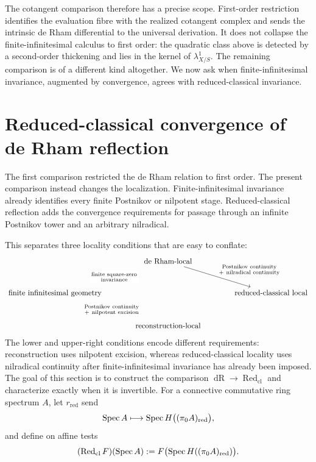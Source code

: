 The cotangent comparison therefore has a precise scope. First-order
restriction identifies the evaluation fibre with the realized cotangent
complex and sends the intrinsic de Rham differential to the universal
derivation. It does not collapse the finite-infinitesimal calculus to first
order: the quadratic class above is detected by a second-order thickening and
lies in the kernel of \(\lambda^1_{X/S}\). The remaining comparison is of a
different kind altogether. We now ask when finite-infinitesimal invariance,
augmented by convergence, agrees with reduced-classical invariance.
\section{Reduced-classical convergence of de Rham reflection}
\label{sec:reduced-classical-shadow}

The first comparison restricted the de Rham relation to first order. The
present comparison instead changes the localization. Finite-infinitesimal
invariance already identifies every finite Postnikov or nilpotent stage.
Reduced-classical reflection adds the convergence requirements for passage
through an infinite Postnikov tower and an arbitrary nilradical.

This separates three locality conditions that are easy to conflate:
\[
\begin{tikzcd}[column sep=large,row sep=large]
  & \text{de Rham-local}
      \arrow[dl,phantom,"\substack{\text{finite square-zero}\\\text{invariance}}" description]
      \arrow[dr,"\substack{\text{Postnikov continuity}\\+\ \text{nilradical continuity}}"]
  &
  \\
  \text{finite infinitesimal geometry}
  &&
  \text{reduced-classical local}
  \\
  & \text{reconstruction-local}
      \arrow[ul,phantom,"\substack{\text{Postnikov continuity}\\+\ \text{nilpotent excision}}" description]
  &
\end{tikzcd}
\]
The lower and upper-right conditions encode different requirements:
reconstruction uses nilpotent excision, whereas reduced-classical locality uses
nilradical continuity after finite-infinitesimal invariance has already been
imposed.
The goal of this section is to construct the comparison
\(\operatorname{dR}\to\operatorname{Red}_{\mathrm{cl}}\) and characterize
exactly when it is invertible.
For a connective commutative ring
spectrum \(A\), let \(r_{\mathrm{red}}\) send
\[
  \operatorname{Spec} A
  \longmapsto
  \operatorname{Spec} H\bigl((\pi_0A)_{\mathrm{red}}\bigr),
\]
and define on affine tests
\[
  (\operatorname{Red}_{\mathrm{cl}}F)(\operatorname{Spec} A)
  :=
  F\bigl(\operatorname{Spec} H((\pi_0A)_{\mathrm{red}})\bigr).
\]

